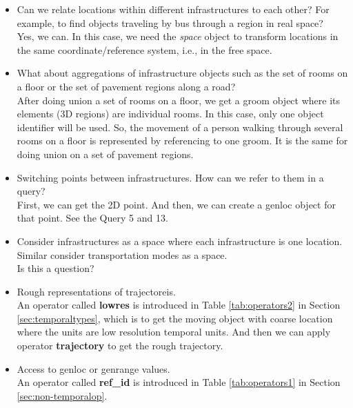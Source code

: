 \begin{itemize}
 \item Can we relate locations within different infrastructures to each other? For example, to find objects traveling by bus through a region in real space? \\
 
 Yes, we can. In this case, we need the \textit{space} object to transform locations in the same coordinate/reference system, i.e., in the free space.  

 \item What about aggregations of infrastructure objects such as the set of rooms on a floor or the set of pavement regions along a road? \\

  After doing union a set of rooms on a floor, we get a groom object where its elements (3D regions) are individual rooms. In this case, only one object identifier will be used. So, the movement of a person walking through several rooms on a floor is represented by referencing to one groom. It is the same for doing union on a set of pavement regions. 

 \item Switching points between infrastructures. How can we refer to them in a query? \\

  First, we can get the 2D point. And then, we can create a genloc object for that point. See the Query 5 and 13.\\

 \item Consider infrastructures as a space where each infrastructure is one location. Similar consider transportation modes as a space. \\

 Is this a question? \\ 

 \item Rough representations of trajectoreis. \\

 An operator called \textbf{lowres} is introduced in Table \ref{tab:operators2} in Section \ref{sec:temporaltypes}, which is to get the moving object with coarse location where the units are low resolution temporal units. And then we can apply operator \textbf{trajectory} to get the rough trajectory. 

 \item Access to genloc or genrange values. \\

      An operator called \textbf{ref\_id} is introduced in Table \ref{tab:operators1} in Section \ref{sec:non-temporalop}.
\end{itemize}
